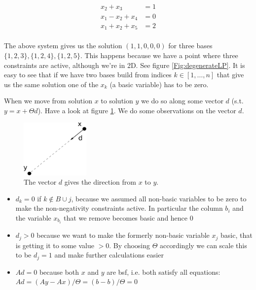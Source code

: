\begin{align*}
x_2 + x_3 &= 1\\
x_1 - x_2 +x_4 &=0\\
x_1 + x_2 +x_5 &= 2\\
\end{align*}


The above system gives us the solution $(1,1,0,0,0)$ for three bases $\{1,2,3\},\{1,2,4\},\{1,2,5\}$. This happens because we have a point where three constraints are active, although we're in 2D. See figure \ref{Fig:degenerateLP}. It is easy to see that if we have two bases build from indices $k\in [1,\ldots,n]$ that give us the same solution one of the $x_k$ (a basic variable) has to be zero. %


When we move from solution $x$ to solution $y$ we do so along some vector $d$ (s.t. $y=x+\Theta d$). Have a look at figure \ref{Fig:movingToSolutions}. We do some observations on the vector $d$. 

\begin{figure}[hbt]
\begin{center}
\includegraphics[width=0.3\textwidth]{./images/movingToSolutions.pdf}
\end{center}
\caption{The vector $d$ gives the direction from $x$ to $y$.}
\label{Fig:movingToSolutions}
\end{figure}


\begin{itemize}
\item $d_k=0$ if $k\not \in B \cup j$, because we assumed all non-basic variables to be zero to make the non-negativity constraints active. In particular the column $b_i$ and the variable $x_{b_i}$ that we remove becomes basic and hence 0
\item $d_j>0$ because we want to make the formerly non-basic variable $x_j$ basic, that is getting it to some value $>0$. By choosing $\Theta$ accordingly we can scale this to be $d_j=1$ and make further calculations easier
\item $Ad = 0$ because both $x$ and $y$ are bsf, i.e. both satisfy all equations: $Ad = (Ay-Ax)/\Theta = (b-b)/\Theta = 0$
\end{itemize}

